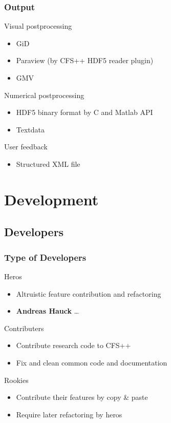 \documentclass{beamer}
\begin{document}
\begin{frame}
\frametitle{Output}
Visual postprocessing
\begin{itemize}
  \item GiD
  \item Paraview (by CFS++ HDF5 reader plugin)
  \item GMV
\end{itemize}
Numerical postprocessing
\begin{itemize}
  \item HDF5 binary format by C and Matlab API
  \item Textdata
\end{itemize}
User feedback
\begin{itemize}
  \item Structured XML file

\end{itemize}
\end{frame}



\section{Development}

\subsection{Developers}

\begin{frame}
\frametitle{Type of Developers}
Heros
\begin{itemize}
  \item Altruistic feature contribution and refactoring
  \item \textbf{Andreas Hauck} \ldots
\end{itemize}
Contributers
\begin{itemize}
  \item Contribute research code to CFS++
  \item Fix and clean common code and documentation
\end{itemize}
Rookies
\begin{itemize}
  \item Contribute their features by copy \& paste
  \item Require later refactoring by heros  
\end{itemize}

\end{frame}
\end{document}
